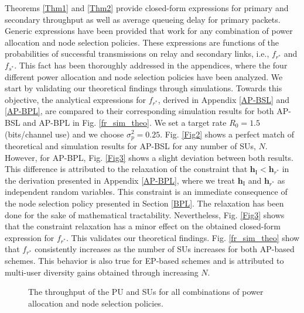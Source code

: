 \documentclass[journal,twocolumn]{IEEEtran}
\begin{document}
Theorems \ref{Thm1} and \ref{Thm2} provide closed-form expressions for primary and secondary throughput as well as average queueing delay for primary packets. Generic expressions have been provided that work for any combination of power allocation and node selection policies. These expressions are functions of the probabilities of successful transmissions on relay and secondary links, i.e., $f_{r^*}$ and $f_{s^*}$. This fact has been thoroughly addressed in the appendices, where the four different power allocation and node selection policies have been analyzed. We start by validating our theoretical findings through simulations. Towards this objective, the analytical expressions for $f_{r^*}$, derived in Appendix \ref{AP-BSL} and \ref{AP-BPL}, are compared to their corresponding simulation results for both AP-BSL and AP-BPL in Fig. \ref{fr_sim_theo}. We set a target rate $R_{0}=1.5$ (bits/channel use) and we choose $\sigma_{p}^{2}=0.25$. Fig. \ref{Fig2} shows a perfect match of theoretical and simulation results for AP-BSL for any number of SUs, $N$. However, for AP-BPL, Fig. \ref{Fig3} shows a slight deviation between both results. This difference is attributed to the relaxation of the constraint that $\mathbf{h}_{\mathrm{I}} < \mathbf{h}_{r^*}$ in the derivation presented in Appendix \ref{AP-BPL}, where we treat $\mathbf{h}_{\mathrm{I}}$ and $\mathbf{h}_{r^*}$ as independent random variables. This constraint is an immediate consequence of the node selection policy presented in Section \ref{BPL}. The relaxation has been done for the sake of mathematical tractability. Nevertheless, Fig. \ref{Fig3} shows that the constraint relaxation has a minor effect on the obtained closed-form expression for $f_{r^*}$. This validates our theoretical findings. Fig. \ref{fr_sim_theo} show that $f_{r^*}$ consistently increases as the number of SUs increases for both AP-based schemes. This behavior is also true for EP-based schemes and is attributed to multi-user diversity gains obtained through increasing $N$.      




\begin{figure*}[t]
 \centering
 \caption{The throughput of the PU and SUs for all combinations of power allocation and node selection policies.}
 \label{PU_SU_thrpt}
  \vspace{-3mm}
\end{figure*}
\end{document}

